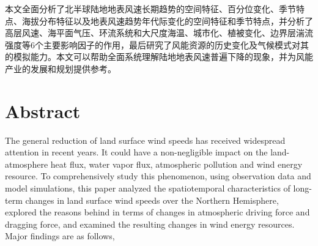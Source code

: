 本文全面分析了北半球陆地地表风速长期趋势的空间特征、百分位变化、季节特点、海拔分布特征以及地表风速趋势年代际变化的空间特征和季节特点，并分析了高层风速、海平面气压、环流系统和大尺度海温、城市化、植被变化、边界层湍流强度等6个主要影响因子的作用，最后研究了风能资源的历史变化及气候模式对其的模拟能力。本文可以帮助全面系统理解陆地地表风速普遍下降的现象，并为风能产业的发展和规划提供参考。

\intobmk\chapter*{Abstract}%

The general reduction of land surface wind speeds has received widespread attention in recent years. It could have a non-negligible impact on the land-atmosphere heat flux, water vapor flux, atmospheric pollution and wind energy resource. To comprehensively study this phenomenon, using observation data and model simulations, this paper analyzed the spatiotemporal characteristics of long-term changes in land surface wind speeds over the Northern Hemisphere, explored the reasons behind in terms of changes in atmospheric driving force and dragging force, and examined the resulting changes in wind energy resources. Major findings are as follows,

